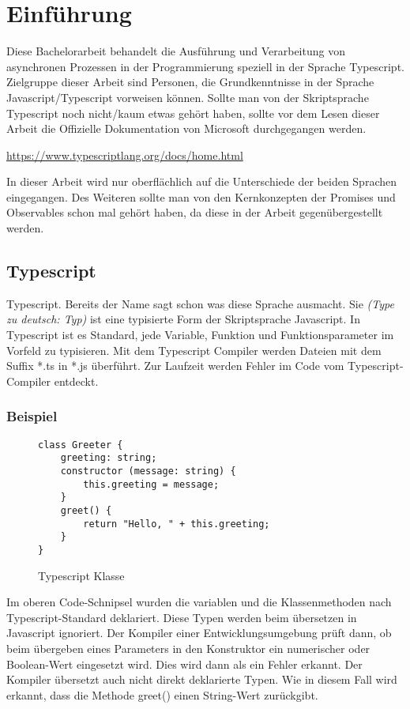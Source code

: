 \setcounter{secnumdepth}{1}
\section{Einführung}
Diese Bachelorarbeit behandelt die Ausführung und Verarbeitung von asynchronen Prozessen in der Programmierung speziell in der Sprache Typescript.\\
Zielgruppe dieser Arbeit sind Personen, die Grundkenntnisse in der Sprache Javascript/Typescript vorweisen können.
Sollte man von der Skriptsprache Typescript noch nicht/kaum etwas gehört haben, sollte vor dem Lesen dieser Arbeit die Offizielle Dokumentation von Microsoft durchgegangen werden.

\begin{center}
\url{https://www.typescriptlang.org/docs/home.html}
\end{center}

In dieser Arbeit wird nur oberflächlich auf die Unterschiede der beiden Sprachen eingegangen. Des Weiteren sollte man von den Kernkonzepten der Promises und Observables schon mal gehört haben, da diese in der Arbeit gegenübergestellt werden.

\subsection{Typescript}
Typescript. Bereits der Name sagt schon was diese Sprache ausmacht. Sie \textit{(\glqq{}Type\grqq{} zu deutsch: Typ)} ist eine typisierte Form der Skriptsprache Javascript. In Typescript ist es Standard, jede Variable, Funktion und Funktionsparameter im Vorfeld zu typisieren. Mit dem Typescript Compiler werden Dateien mit dem Suffix *.ts in *.js überführt. Zur Laufzeit werden Fehler im Code vom Typescript-Compiler entdeckt.

\subsubsection{Beispiel}

\begin{figure}[h!]
\begin{lstlisting}
class Greeter {
    greeting: string;
    constructor (message: string) {
        this.greeting = message;
    }
    greet() {
        return "Hello, " + this.greeting;
    }
}  
\end{lstlisting}
\caption{Typescript Klasse \cite{typescript-example}}
\end{figure}

Im oberen Code-Schnipsel wurden die variablen und die Klassenmethoden nach Typescript-Standard deklariert. Diese Typen werden beim übersetzen in Javascript ignoriert. Der Kompiler einer Entwicklungsumgebung prüft dann, ob beim übergeben eines Parameters in den Konstruktor ein numerischer oder Boolean-Wert eingesetzt wird. Dies wird dann als ein Fehler erkannt. Der Kompiler übersetzt auch nicht direkt deklarierte Typen. Wie in diesem Fall wird erkannt, dass die Methode greet() einen String-Wert zurückgibt.

